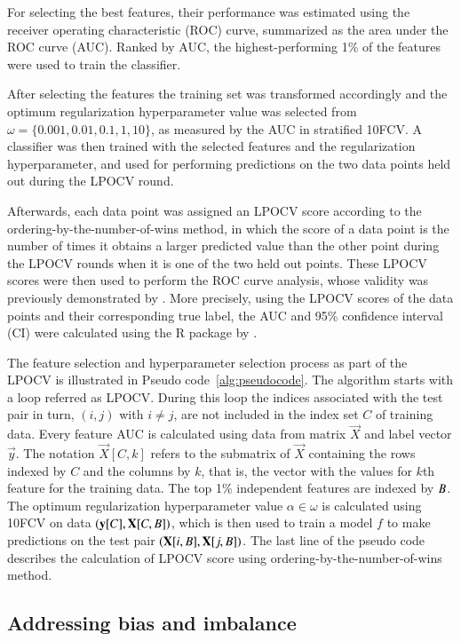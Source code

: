 For selecting the best features, their performance was estimated using the
receiver operating characteristic (ROC) curve, summarized as the area under the
ROC curve (AUC). Ranked by AUC, the highest-performing 1\% of the features were
used to train the classifier.

After selecting the features the training set was transformed accordingly and
the optimum regularization hyperparameter value was selected from $\omega =
\{0.001, 0.01, 0.1, 1, 10\}$, as measured by the AUC in stratified 10FCV\@. A
classifier was then trained with the selected features and the regularization
hyperparameter, and used for performing predictions on the two data points held
out during the LPOCV round.

Afterwards, each data point was assigned an LPOCV score according to the
ordering-by-the-number-of-wins method, in which the score of a data point is the
number of times it obtains a larger predicted value than the other point during
the LPOCV rounds when it is one of the two held out points. These LPOCV scores
were then used to perform the ROC curve analysis, whose validity was previously
demonstrated by \citet{Balcan2008}. More precisely, using the LPOCV scores of
the data points and their corresponding true label, the AUC and 95\% confidence
interval (CI) were calculated using the R package by \citet{LeDell2015}.

The feature selection and hyperparameter selection process as part of the LPOCV
is illustrated in Pseudo code~\ref{alg:pseudocode}. The algorithm starts with a
loop referred as LPOCV\@. During this loop the indices associated with the test
pair in turn, $(i,j)$ with $i \neq j$, are not included in the index set $C$ of
training data. Every feature AUC is calculated using data from matrix $\vec{X}$
and label vector $\vec{y}$. The notation $\vec{X}[C,k]$ refers to the submatrix
of $\vec{X}$ containing the rows indexed by $C$ and the columns by $k$, that is,
the vector with the values for $k$th feature for the training data. The top 1\%
independent features are indexed by $B$. The optimum regularization
hyperparameter value $\alpha \in \omega$ is calculated using 10FCV on data
$(\mathbf{y}[C], \mathbf{X}[C,B])$, which is then used to train a model $f$ to
make predictions on the test pair $(\mathbf{X}[i,B], \mathbf{X}[j,B])$. The
last line of the pseudo code describes the calculation of LPOCV score using
ordering-by-the-number-of-wins method.


\subsection{Addressing bias and imbalance}

